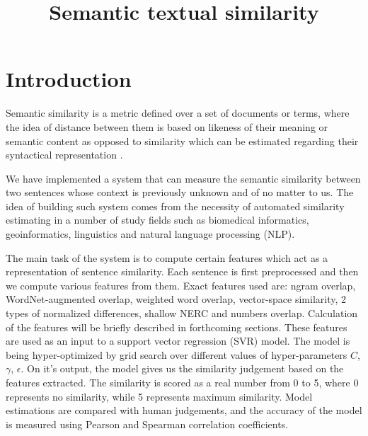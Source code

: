 \documentclass[10pt, a4paper]{article}
\title{Semantic textual similarity}
\begin{document}
\maketitleabstract

\section{Introduction}



Semantic similarity is a metric defined over a set of documents or terms, where the idea of distance between them is based on likeness of their meaning or semantic content as opposed to similarity which can be estimated regarding their syntactical representation \citep{wiki_semantic}.

We have implemented a system that can measure the semantic similarity between two sentences whose context is previously unknown and of no matter to us. The idea of building such system comes from the necessity of automated similarity estimating in a number of study fields such as biomedical informatics, geoinformatics, linguistics and natural language processing (NLP).

The main task of the system is to compute certain features which act as a representation of sentence similarity. Each sentence is first preprocessed and then we compute various features from them. Exact features used are: ngram overlap, WordNet-augmented overlap, weighted word overlap, vector-space similarity, 2 types of normalized differences, shallow NERC and numbers overlap. Calculation of the features will be briefly described in forthcoming sections. These features are used as an input to a support vector regression (SVR) model. The model is being hyper-optimized by grid search over different values of hyper-parameters $C$, $\gamma$, $\epsilon$. On it's output, the model gives us the similarity judgement based on the features extracted. The similarity is scored as a real number from 0 to 5, where 0 represents no similarity, while 5 represents maximum similarity. Model estimations are compared with human judgements, and the accuracy of the model is measured using Pearson and Spearman correlation coefficients.
\end{document}
